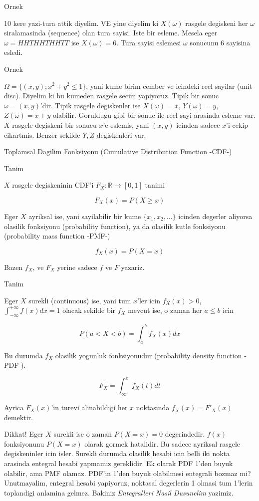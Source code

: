 \documentclass[12pt,fleqn]{article}\usepackage{../common}
\begin{document}
Ornek

10 kere yazi-tura attik diyelim. VE yine diyelim ki $X(\omega)$ rasgele
degiskeni her $\omega$ siralamasinda (sequence) olan tura sayisi. Iste bir
esleme. Mesela eger $\omega = HHTHHTHHTT$ ise $X(\omega) = 6$. Tura sayisi
eslemesi $\omega$ sonucunu 6 sayisina esledi. 

Ornek 

$\Omega = \{ (x,y); x^2+y^2 \le 1 \}$, yani kume birim cember ve icindeki
reel sayilar (unit disc). Diyelim ki bu kumeden rasgele secim
yapiyoruz. Tipik bir sonuc $\omega = (x,y)$'dir. Tipik rasgele degiskenler
ise $X(\omega) = x$, $Y(\omega) = y$, $Z(\omega) = x+y$ olabilir. Goruldugu
gibi bir sonuc ile reel sayi arasinda esleme var. $X$ rasgele degiskeni
bir sonucu $x$'e eslemis, yani $(x,y)$ icinden sadece $x$'i cekip
cikartmis. Benzer sekilde $Y,Z$ degiskenleri var. 

Toplamsal Dagilim Fonksiyonu (Cumulative Distribution Function -CDF-)

Tanim

$X$ rasgele degiskeninin CDF'i $F_X: \mathbb{R} \to [0,1]$ tanimi

\[ F_X(x) = P(X \ge x) \]

Eger $X$ ayriksal ise, yani sayilabilir bir kume $\{x_1,x_2,...\}$ icinden
degerler aliyorsa olasilik fonksiyonu (probability function), ya da
olasilik kutle fonksiyonu (probability mass function -PMF-) 

\[ f_X(x) = P(X = x) \]

Bazen $f_X$, ve $F_X$ yerine sadece $f$ ve $F$ yazariz. 

Tanim

Eger $X$ surekli (continuous) ise, yani tum $x$'ler icin $f_X(x) > 0$,
$\int_{-\infty}^{+\infty}f(x) dx = 1$ olacak sekilde bir $f_X$ mevcut ise, o zaman her $a \le b$ icin

\[ P(a<X<b) = \int_{a}^{b}f_X(x)dx \]

Bu durumda $f_X$ olasilik yogunluk fonksiyonudur (probability density function
-PDF-). 

\[ F_X = \int_{\infty}^{x}f_X(t)dt \]

Ayrica $F_X(x)$'in turevi alinabildigi her $x$ noktasinda  $f_X(x) = F'_X(x)$
demektir. 

Dikkat! Eger $X$ surekli ise o zaman $P(X = x) = 0$ degerindedir. $f(x)$
fonksiyonunu $P(X=x)$ olarak gormek hatalidir. Bu sadece ayriksal rasgele
degiskeninler icin isler. Surekli durumda olasilik hesabi icin belli iki
nokta arasinda entegral hesabi yapmamiz gereklidir. Ek olarak PDF 1'den
buyuk olabilir, ama PMF olamaz. PDF'in 1'den buyuk olabilmesi entegrali
bozmaz mi? Unutmayalim, entegral hesabi yapiyoruz, noktasal degerlerin 1
olmasi tum 1'lerin toplandigi anlamina gelmez. Bakiniz {\em Entegralleri
  Nasil Dusunelim} yazimiz.
\end{document}
